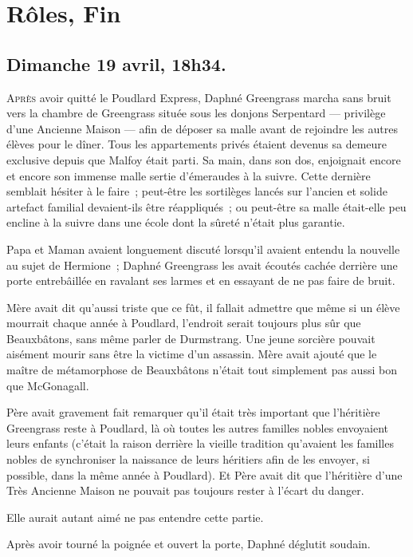 \chapter{Rôles, Fin}

\section{Dimanche 19 avril, 18h34.}

\lettrine{A}{près} avoir quitté le Poudlard Express, Daphné Greengrass marcha sans bruit vers la chambre de Greengrass située sous les donjons Serpentard — privilège d'une Ancienne Maison — afin de déposer sa malle avant de rejoindre les autres élèves pour le dîner. Tous les appartements privés étaient devenus sa demeure exclusive depuis que Malfoy était parti. Sa main, dans son dos, enjoignait encore et encore son immense malle sertie d'émeraudes à la suivre. Cette dernière semblait hésiter à le faire~; peut-être les sortilèges lancés sur l'ancien et solide artefact familial devaient-ils être réappliqués~; ou peut-être sa malle était-elle peu encline à la suivre dans une école dont la sûreté n'était plus garantie.

Papa et Maman avaient longuement discuté lorsqu'il avaient entendu la nouvelle au sujet de Hermione~; Daphné Greengrass les avait écoutés cachée derrière une porte entrebâillée en ravalant ses larmes et en essayant de ne pas faire de bruit.

Mère avait dit qu'aussi triste que ce fût, il fallait admettre que même si un élève mourrait chaque année à Poudlard, l'endroit serait toujours plus sûr que Beauxbâtons, sans même parler de Durmstrang. Une jeune sorcière pouvait aisément mourir sans être la victime d'un assassin. Mère avait ajouté que le maître de métamorphose de Beauxbâtons n'était tout simplement pas aussi bon que McGonagall.

Père avait gravement fait remarquer qu'il était très important que l'héritière Greengrass reste à Poudlard, là où toutes les autres familles nobles envoyaient leurs enfants (c'était la raison derrière la vieille tradition qu'avaient les familles nobles de synchroniser la naissance de leurs héritiers afin de les envoyer, si possible, dans la même année à Poudlard). Et Père avait dit que l'héritière d'une Très Ancienne Maison ne pouvait pas toujours rester à l'écart du danger.

Elle aurait autant aimé ne pas entendre cette partie.

Après avoir tourné la poignée et ouvert la porte, Daphné déglutit soudain.

